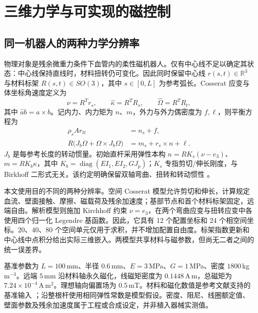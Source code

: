 \section{三维力学与可实现的磁控制}
\label{sec:model-control}

\subsection{同一机器人的两种力学分辨率}
物理对象是残余微重力条件下血管内的柔性磁机器人。仅有中心线不足以确定其状态：中心线保持直线时，材料扭转仍可变化。因此同时保留中心线 $r(s,t)\in\mathbb R^3$ 与材料标架 $R(s,t)\in SO(3)$，其中 $s\in[0,L]$ 为参考弧长。Cosserat 应变与体坐标角速度定义为
\begin{equation}
 \nu=R^Tr_s,\qquad \widehat\kappa=R^TR_s,\qquad
 \widehat\Omega=R^TR_t,
 \label{eq:rod-kinematics}
\end{equation}
其中 $\widehat a b=a\times b$。记内力、内力矩为 $n$、$m$，外力与外力偶密度为 $f,\ell$，则平衡方程为
\begin{equation}
\begin{aligned}
 \rho_s A r_{tt}&=n_s+f,\\
 R\bigl(J_b\dot\Omega+\Omega\times J_b\Omega\bigr)
 &=m_s+r_s\times n+\ell.
\end{aligned}
 \label{eq:rod-balance}
\end{equation}
$J_b$ 是每参考长度的转动惯量。初始直杆采用弹性本构
$n=RK_s(\nu-e_3)$、$m=RK_b\kappa$，其中
$K_b=\operatorname{diag}(EI_1,EI_2,GJ_p)$；$K_s$ 专指剪切/伸长刚度，与 Birkhoff 二形式无关。该约定明确保留双轴弯曲、扭转和转动惯性 \citep{Antman2005,Gazzola2018}。

本文使用目的不同的两种分辨率。空间 Cosserat 模型允许剪切和伸长，计算规定血流、壁面接触、摩擦、磁载荷及残余加速度；基部节点和首个材料标架固定，远端自由。解析模型则施加 Kirchhoff 约束 $\nu=e_3$，在两个弯曲应变与扭转应变中各使用四个归一化 Legendre 基函数。因此，它具有 12 个配置坐标和 24 个相空间坐标。20、40、80 个空间单元仅用于求积，并不增加配置自由度。标架指数更新和中心线中点积分给出实际三维嵌入。两模型共享材料与磁参数，但尚无二者之间的统一误差界。

基准参数为 $L=100$\,mm、半径 $0.6$\,mm、$E=3$\,MPa、$G=1$\,MPa、密度 $1800$\,kg\,m$^{-3}$。远端 $5$\,mm 沿材料轴永久磁化，线磁矩密度为 $0.1448$\,A\,m，总磁矩为 $7.24\times10^{-4}$\,A\,m$^2$。理想轴向偏置场为 $0.5$\,mT。材料和磁化数值是参考文献支持的基准输入 \citep{Tong2025}；沿整根杆使用相同弹性常数是模型假设。密度、阻尼、线圈额定值、壁面参数及残余加速度属于工程或合成设定，并非植入器械实测值。

